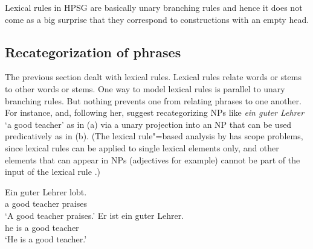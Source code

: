 \documentclass[output=paper
  ,nobabel
  ,draftmode
  ,uniformtopskip %
  ,colorlinks, citecolor=brown
]{langscibook}
\begin{document}

Lexical rules in HPSG are basically unary branching rules \citep{BC99a,Meurers2001a} and hence it does not
come as a big surprise that they correspond to constructions with an empty head.

\subsection{Recategorization of phrases}
\label{sec-recategorization}

The previous section dealt with lexical rules. Lexical rules relate words or stems to other words or
stems. One way to model lexical rules is parallel to unary branching rules. But nothing prevents one
from relating phrases to one another. For instance, \citet{Partee86b-u} and, following her, \citet{MuellerPredication}
suggest recategorizing NPs like \emph{ein guter Lehrer} `a good teacher' as in
(a) via a unary projection into an NP that can be used predicatively as in (b). (The
lexical rule"=based analysis by \citet[]{GSag2000a-u} has scope problems, since lexical
rules can be applied to single lexical elements only, and other elements that can appear in NPs (adjectives for
example) cannot be part of the input of the lexical rule \citep{Kasper97a,MuellerCopula}.)

\eal
\ex 
\gll Ein guter Lehrer lobt.\\
     a good teacher praises\\
\glt `A good teacher praises.'
\ex 
\gll Er ist ein guter Lehrer.\\
     he is a good teacher\\
\glt `He is a good teacher.'
\zl
\end{document}
